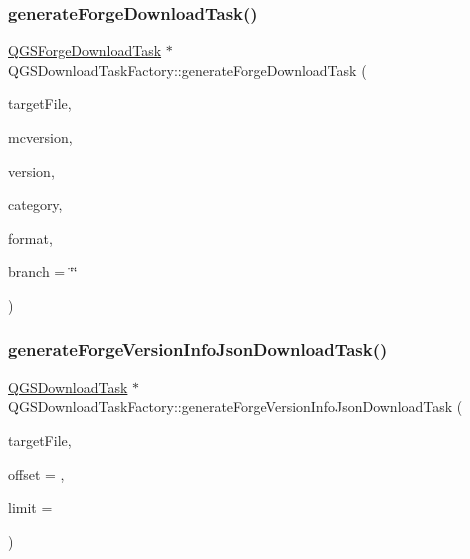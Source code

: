 \subsubsection{\texorpdfstring{generate\+Forge\+Download\+Task()}{generateForgeDownloadTask()}}
{\footnotesize\ttfamily \mbox{\hyperlink{class_q_g_s_forge_download_task}{Q\+G\+S\+Forge\+Download\+Task}} $\ast$ Q\+G\+S\+Download\+Task\+Factory\+::generate\+Forge\+Download\+Task (\begin{DoxyParamCaption}\item[{Q\+File $\ast$}]{target\+File,  }\item[{const Q\+String \&}]{mcversion,  }\item[{const Q\+String \&}]{version,  }\item[{const Q\+String \&}]{category,  }\item[{const Q\+String \&}]{format,  }\item[{const Q\+String \&}]{branch = {\ttfamily \char`\"{}\char`\"{}} }\end{DoxyParamCaption})}

\mbox{\label{class_q_g_s_download_task_factory_aa4ca356202f7684fca15d406458be232}} 
\subsubsection{\texorpdfstring{generate\+Forge\+Version\+Info\+Json\+Download\+Task()}{generateForgeVersionInfoJsonDownloadTask()}}
{\footnotesize\ttfamily \mbox{\hyperlink{class_q_g_s_download_task}{Q\+G\+S\+Download\+Task}} $\ast$ Q\+G\+S\+Download\+Task\+Factory\+::generate\+Forge\+Version\+Info\+Json\+Download\+Task (\begin{DoxyParamCaption}\item[{Q\+File $\ast$}]{target\+File,  }\item[{int}]{offset = {},  }\item[{int}]{limit = {} }\end{DoxyParamCaption})}

\mbox{\label{class_q_g_s_download_task_factory_a6e6cf8557ac479052b62d11b678d03d7}} 
